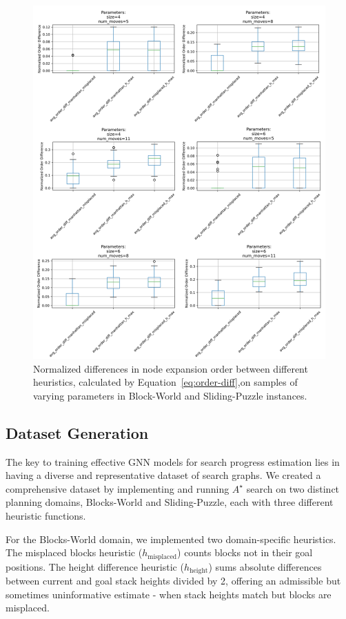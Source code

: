 \documentclass[letterpaper]{article}
\begin{document}
\begin{figure}[ht]
\begin{minipage}{0.39\textwidth}
        \includegraphics[width=\textwidth]{plots/sliding_puzzle_order_differences.png}
    \end{minipage}
    \caption{Normalized differences in node expansion order between different heuristics, calculated by Equation~\ref{eq:order-diff},on samples of varying parameters in Block-World and Sliding-Puzzle instances.}
    \label{fig:heuristic-order}
\end{figure}

\subsection{Dataset Generation}

The key to training effective GNN models for search progress estimation lies in having a diverse and representative dataset of search graphs. We created a comprehensive dataset by implementing and running $A^{\star}$ search on two distinct planning domains, Blocks-World and Sliding-Puzzle, each with three different heuristic functions.

For the Blocks-World domain, we implemented two domain-specific heuristics. The misplaced blocks heuristic ($h_{\text{misplaced}}$) counts blocks not in their goal positions. The height difference heuristic ($h_{\text{height}}$) sums absolute differences between current and goal stack heights divided by 2, offering an admissible but sometimes uninformative estimate - when stack heights match but blocks are misplaced.
\end{document}
